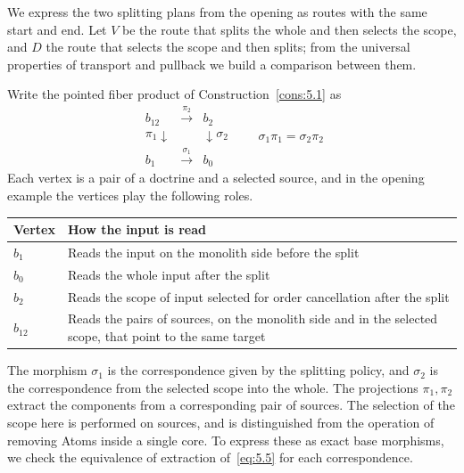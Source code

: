 We express the two splitting plans from the opening as routes with the same start and end.
Let $V$ be the route that splits the whole and then selects the scope, and $D$ the route that
selects the scope and then splits; from the universal properties of transport and pullback
we build a comparison between them.

\begin{construction}\label{cons:5.10}

Write the pointed fiber product of Construction~\ref{cons:5.1} as
\begin{equation*}
\begin{array}{ccc}
b_{12}&\xrightarrow{\ \pi_2\ }&b_2\\
{\scriptstyle\pi_1}\downarrow&&\downarrow{\scriptstyle\sigma_2}\\
b_1&\xrightarrow{\ \sigma_1\ }&b_0
\end{array}
\qquad \sigma_1\pi_1=\sigma_2\pi_2
\tag{5.14}\label{eq:5.14}
\end{equation*}
Each vertex is a pair of a doctrine and a selected source, and in the opening example the
vertices play the following roles.

\begin{xltabular}{\linewidth}{@{}LL@{}}
\toprule
Vertex & How the input is read \\
\midrule
\endhead
$b_1$ & Reads the input on the monolith side before the split \\
\addlinespace[3pt]
$b_0$ & Reads the whole input after the split \\
\addlinespace[3pt]
$b_2$ & Reads the scope of input selected for order cancellation after the split \\
\addlinespace[3pt]
$b_{12}$ & Reads the pairs of sources, on the monolith side and in the selected scope,
that point to the same target \\
\bottomrule
\end{xltabular}

The morphism $\sigma_1$ is the correspondence given by the splitting policy, and $\sigma_2$
is the correspondence from the selected scope into the whole. The projections $\pi_1,\pi_2$
extract the components from a corresponding pair of sources. The selection of the scope here
is performed on sources, and is distinguished from the operation of removing Atoms inside a
single core. To express these as exact base morphisms, we check the equivalence of
extraction of~\eqref{eq:5.5} for each correspondence.


\end{construction}
